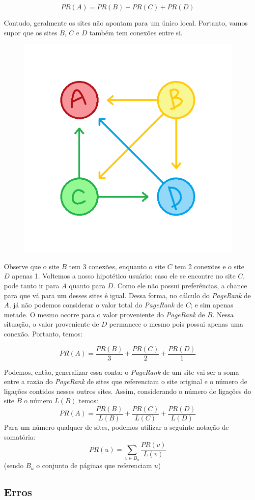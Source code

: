 \documentclass[11pt]{article}
\begin{document}
\[PR(A) = PR(B) + PR(C) + PR(D)\]

\newpage

    Contudo, geralmente os sites não apontam para um único local. Portanto,
vamos supor que os sites \(B\), \(C\) e \(D\) também tem conexões entre
si.

\begin{figure}
\centering
\includegraphics[width = .4\textwidth]{../img/ABCD3.png}
\end{figure}

Observe que o site \(B\) tem 3 conexões, enquanto o site \(C\) tem 2
conexões e o site \(D\) apenas 1. Voltemos a nosso hipotético usuário:
caso ele se encontre no site \(C\), pode tanto ir para \(A\) quanto para
\(D\). Como ele não possui preferências, a chance para que vá para um
desses sites é igual. Dessa forma, no cálculo do \emph{PageRank} de
\(A\), já não podemos considerar o valor total do \emph{PageRank} de
\(C\); e sim apenas metade. O mesmo ocorre para o valor proveniente do
\emph{PageRank} de \(B\). Nessa situação, o valor proveniente de \(D\)
permanece o mesmo pois possui apenas uma conexão. Portanto, temos:

\[PR(A) = \displaystyle \frac{PR(B)}{3} + \frac{PR(C)}{2} + \frac{PR(D)}{1}\]

    Podemos, então, generalizar essa conta: o \emph{PageRank} de um site vai
ser a soma entre a razão do \emph{PageRank} de sites que referenciam o
site original e o número de ligações contidos nesses outros sites.
Assim, considerando o número de ligações do site \(B\) o número \(L(B)\)
temos:
\[PR(A) = \displaystyle \frac{PR(B)}{L(B)} + \frac{PR(C)}{L(C)} + \frac{PR(D)}{L(D)}\]
Para um número qualquer de sites, podemos utilizar a seguinte notação de
somatória:
\[{\displaystyle PR(u)=\sum _{v\in B_{u}}{\frac {PR(v)}{L(v)}}}\] (sendo
\(B_u\) o conjunto de páginas que referenciam \(u\))

\newpage

    \hypertarget{erros}{%
\subsection{Erros}\label{erros}}
\end{document}
